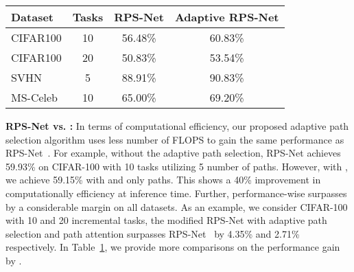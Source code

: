 \begin{table}[h]
\begin{minipage}{1\columnwidth}
\vspace{0.5cm}
            \begin{center}
            \begin{tabular}{l c c c}
            \toprule
           \textbf{Dataset} & \textbf{Tasks} & \textbf{RPS-Net} & \textbf{Adaptive RPS-Net}  \\
             \midrule
            CIFAR100 & 10   & 56.48\%  &  60.83\% \\
            CIFAR100 & 20   & 50.83\%  &  53.54\%  \\
            SVHN     & 5    & 88.91\%  &  90.83\%  \\
            MS-Celeb & 10   & 65.00\%  &  69.20\%  \\
            \bottomrule
            \end{tabular}
            \end{center}
            \label{tbl:old_vs_new}
\end{minipage}  
\end{table}

\textbf{RPS-Net vs. \ours{}:} In terms of computational efficiency, our proposed adaptive path selection algorithm uses less number of FLOPS to gain the same performance as RPS-Net~\cite{rajasegaran2019random}. For example, without the adaptive path selection, RPS-Net achieves 59.93\% on CIFAR-100 with 10 tasks utilizing 5 number of paths. However, with \ours{}, we achieve 59.15\% with  and only  paths. This shows a 40\% improvement in computationally efficiency at inference time. Further, performance-wise \ours{} surpasses \cite{rajasegaran2019random} by a considerable margin on all datasets. As an example, we consider CIFAR-100 with 10 and 20 incremental tasks, the modified RPS-Net with adaptive path selection and path attention surpasses RPS-Net~\cite{rajasegaran2019random} by 4.35\% and 2.71\% respectively. In Table~\ref{tbl:old_vs_new}, we provide more comparisons on the performance gain by \ours{}.



